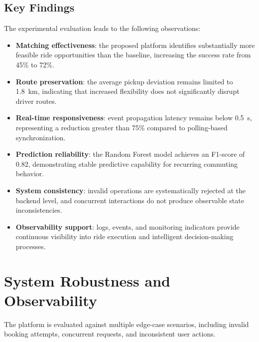 
\subsection{Key Findings}

The experimental evaluation leads to the following observations:

\begin{itemize}
    \item \textbf{Matching effectiveness}: the proposed platform identifies substantially more feasible ride opportunities than the baseline, increasing the success rate from 45\% to 72\%.
    
    \item \textbf{Route preservation}: the average pickup deviation remains limited to 1.8~km, indicating that increased flexibility does not significantly disrupt driver routes.
    
    \item \textbf{Real-time responsiveness}: event propagation latency remains below 0.5~s, representing a reduction greater than 75\% compared to polling-based synchronization.
    
    \item \textbf{Prediction reliability}: the Random Forest model achieves an F1-score of 0.82, demonstrating stable predictive capability for recurring commuting behavior.
    
    \item \textbf{System consistency}: invalid operations are systematically rejected at the backend level, and concurrent interactions do not produce observable state inconsistencies.
    
    \item \textbf{Observability support}: logs, events, and monitoring indicators provide continuous visibility into ride execution and intelligent decision-making processes.
\end{itemize}


\section{System Robustness and Observability}

The platform is evaluated against multiple edge-case scenarios, including invalid booking attempts, concurrent requests, and inconsistent user actions.

